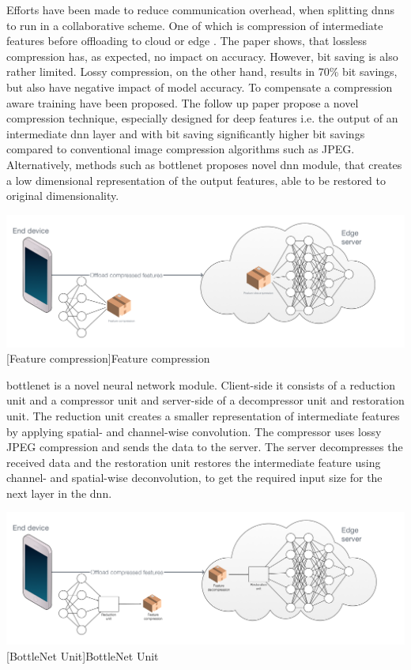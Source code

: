 \begin{enumdescript}
	Efforts have been made to reduce communication overhead, when splitting \gls{dnn}s to run in a collaborative scheme. One of which is compression of intermediate features before offloading to cloud or edge \cite{choi_deep_2018}. The paper shows, that lossless compression has, as expected, no impact on accuracy. However, bit saving is also rather limited. Lossy compression, on the other hand, results in 70\% bit savings, but also have negative impact of model accuracy. To compensate a compression aware training have been proposed. The follow up paper \cite{choi_near-lossless_2018} propose a novel compression technique, especially designed for deep features i.e. the output of an intermediate \gls{dnn} layer and with bit saving significantly higher bit savings compared to conventional image compression algorithms such as JPEG. Alternatively, methods such as \gls{bottlenet} proposes novel \gls{dnn} module, that creates a low dimensional representation of the output features, able to be restored to original dimensionality. 
	
	
	\begin{minipage}[t]{\linewidth}    
		\centering
		\includegraphics[width=\linewidth]{figures/models/compressed}
		[Feature compression]{Feature compression}
	\end{minipage}
	
	\gls{bottlenet} \cite{eshratifar_bottlenet:_2019} is a novel neural network module. Client-side it consists of a reduction unit and a compressor unit and server-side of a decompressor unit and restoration unit. The reduction unit creates a smaller representation of intermediate features by applying spatial- and channel-wise convolution. The compressor uses lossy JPEG compression and sends the data to the server. The server decompresses the received data and the restoration unit restores the intermediate feature using channel- and spatial-wise deconvolution, to get the required input size for the next layer in the \gls{dnn}.
	
	\begin{minipage}[t]{\linewidth}
		\centering
		\includegraphics[width=\linewidth]{figures/models/bottlenet}
		[BottleNet Unit]{BottleNet Unit}
	\end{minipage}
	

\end{enumdescript}
